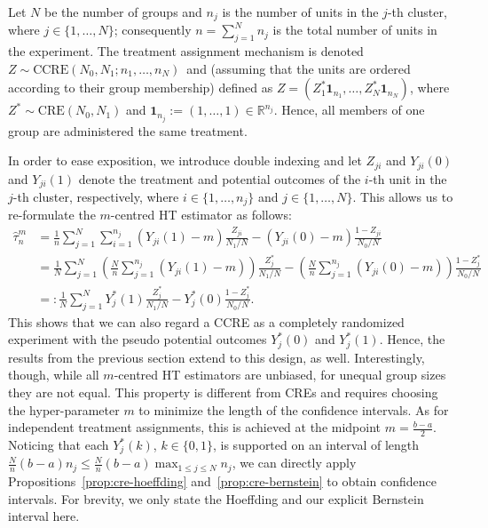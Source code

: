 \documentclass[aos]{imsart2}
\theoremstyle{plain}
\theoremstyle{definition}
\newcommand{\one}{\mathbf{1}}
\newcommand{\R}{\mathbb{R}}
\newcommand{\tauh}{\hat{\tau}}
\newcommand{\cre}{\mathrm{CRE}}
\begin{document}
Let $N$ be the number of groups and $n_j$ is the number of units in the $j$-th cluster, where $j\in\{1,\ldots,N\}$; consequently $n=\sum_{j=1}^N n_j$ is the total number of units in the experiment. The treatment assignment mechanism is denoted $Z \sim \mathrm{CCRE}(N_0,N_1; n_1,\ldots,n_N)$~and (assuming that the units are ordered according to their group membership)  defined as $Z = (Z^*_1 \one_{n_1}, \ldots,Z_N^*\one_{n_N})$, where $Z^* \sim \cre(N_0,N_1)$ and $\one_{n_j}:=(1,\ldots,1)\in \R^{n_j}$. Hence, all members of one group are administered the same treatment.

In order to ease exposition, we introduce double indexing and let $Z_{ji}$ and $Y_{ji}(0)$ and $Y_{ji}(1)$ denote the treatment and potential outcomes of the $i$-th unit in the $j$-th cluster, respectively, where $i\in\{1,\ldots,n_j\}$ and $j \in \{1,\ldots,N\}$. This allows us to re-formulate the $m$-centred HT estimator as follows:
\begin{align*}
    \tauh_n^m &= \frac{1}{n}\sum_{j=1}^N \sum_{i=1}^{n_j}(Y_{ji}(1) -m)\frac{Z_{ji}}{N_1/N} - (Y_{ji}(0) -m)\frac{1-Z_{ji}}{N_0/N}\\
    &= \frac{1}{N}\sum_{j=1}^N\left(\frac{N}{n}\sum_{j=1}^{n_j}(Y_{ji}(1)-m)\right) \frac{Z^*_j}{N_1/N} - \left(\frac{N}{n}\sum_{j=1}^{n_j}(Y_{ji}(0)-m)\right) \frac{1-Z^*_j}{N_0/N}\\
    &=: \frac{1}{N}\sum_{j=1}^N Y_j^*(1) \frac{Z^*_j}{N_1/N} - Y_j^*(0) \frac{1-Z^*_j}{N_0/N}.
\end{align*}
This shows that we can also regard a CCRE as a completely randomized experiment with the pseudo potential outcomes $Y_j^*(0)$ and $Y_j^*(1)$. Hence, the results from the previous section extend to this design, as well. Interestingly, though, while all $m$-centred HT estimators are unbiased, for unequal group sizes they are not equal. This property is different from CREs and requires choosing the hyper-parameter $m$ to minimize the length of the confidence intervals. As for independent treatment assignments, this is achieved at the midpoint $m=\frac{b-a}{2}$. Noticing that each $Y^*_j(k)$, $k\in\{0,1\}$, is supported on an interval of length $\frac{N}{n} (b-a)n_j \leq \frac{N}{n} (b-a) \max_{1\leq j\leq N} n_j$, we can directly apply Propositions~\ref{prop:cre-hoeffding} and~\ref{prop:cre-bernstein} to obtain confidence intervals. For brevity, we only state the Hoeffding and our explicit Bernstein interval here.
\end{document}
